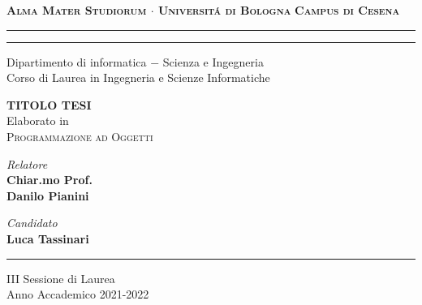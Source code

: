 \begin{titlepage}
    \begin{center}
        {\Large
            \textbf{
                \textsc{Alma Mater Studiorum $\cdot$ Universit\'a di Bologna}
            }
        }
        {\large
            \textbf{
                \textsc{Campus di Cesena}
            }
        }
        \rule[0.1cm]{15.8cm}{0.1mm}
        \rule[0.5cm]{15.8cm}{0.6mm}
        {\Large
                Dipartimento di informatica $-$ Scienza e Ingegneria \\
        }
        \vspace*{4mm}
        {\Large 
            Corso di Laurea in Ingegneria e Scienze Informatiche
        }
        \vspace*{15mm}
        \begin{center}
            {\LARGE
                \textbf{
                    TITOLO TESI
                }
            } \\
            \vspace*{15mm}
            {\Large
                Elaborato in 
            } \\
            \vspace*{3mm}
            {\Large
                \textsc{Programmazione ad Oggetti}
            }
        \end{center}
        \vspace*{40mm}
        \begin{minipage}[t]{0.47\textwidth}
            {\large
                \textit{Relatore} \\
                \textbf{
                    Chiar.mo Prof.\\
                    Danilo Pianini
                }
            }
        \end{minipage}
        \begin{minipage}[t]{0.47\textwidth}\raggedleft
            {\large
                \textit{Candidato} \\
                \textbf{Luca Tassinari}
            }
        \end{minipage}
    \end{center}
    \vspace*{30mm}
    \rule[0.1cm]{15.8cm}{0.1mm}
    \begin{center}
        {\large
            III Sessione di Laurea
        } \\
        \vspace*{2mm}
        {\large
            Anno Accademico 2021-2022
        }
    \end{center}
\end{titlepage}